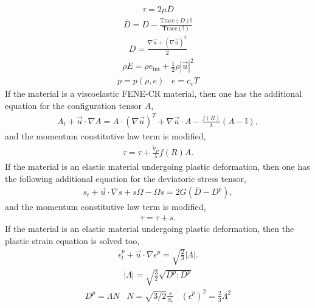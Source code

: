 \documentclass[]{article}
\newcommand{\EyeTen}{\mathbb{I}}
\begin{document}
\begin{eqnarray}
	\tau=2\mu\bar{D}
\end{eqnarray}
\begin{eqnarray}
	\bar{D}=D-\frac{\mbox{Trace}(D)\EyeTen}{\mbox{Trace}(\EyeTen)}
\end{eqnarray}
\begin{eqnarray}
	D=\frac{\nabla\vec{u}+(\nabla\vec{u})^{T}}{2}
\end{eqnarray}
\begin{eqnarray}
	\rho E=\rho e_{\mbox{int}}+
	\frac{1}{2}\rho|\vec{u}|^{2}
\end{eqnarray}
\begin{eqnarray}
	p=p(\rho,e) \hspace{10pt} e=c_{v}T
\end{eqnarray}
If the material is a viscoelastic FENE-CR material, then one has the
additional equation for the configuration tensor $A$,
\begin{eqnarray}
	A_{t}+\vec{u}\cdot\nabla A=A\cdot(\nabla\vec{u})^{T}+
	\nabla\vec{u}\cdot A-\frac{f(R)}{\lambda}(A-\EyeTen),
\end{eqnarray}
and the momentum constitutive law term is modified,
\begin{eqnarray}
	\tau=\tau+\frac{\tilde{\eta}_{P}}{\lambda}f(R)A.
\end{eqnarray}
If the material is an elastic material undergoing plastic deformation, then
one has the following additional equation for the deviatoric stress
tensor,
\begin{eqnarray}
	s_{t}+\vec{u}\cdot\nabla s+s\Omega-\Omega s=2G(\bar{D}-D^{p}),
\end{eqnarray}
and the momentum constitutive law term is modified,
\begin{eqnarray}
	\tau=\tau+s.
\end{eqnarray}
If the material is an elastic material undergoing plastic deformation, then
the plastic strain equation is solved too,
\begin{eqnarray}
	\epsilon^{p}_{t}+\vec{u}\cdot\nabla\epsilon^{p}=
	\sqrt{\frac{2}{3}}|\Lambda|.
\end{eqnarray}
\begin{eqnarray}
	|\Lambda|=\sqrt{\frac{3}{2}}\sqrt{D^{p}:D^{p}}
\end{eqnarray}
\begin{eqnarray}
	D^{p}=\Lambda N  \hspace{10pt} N=\sqrt{3/2}\frac{s}{S_{e}}
	\hspace{10pt} (\dot{\epsilon}^{p})^{2}=
	\frac{2}{3}\Lambda^{2}
	\label{plastic_strain_rate}
\end{eqnarray}
\end{document}
